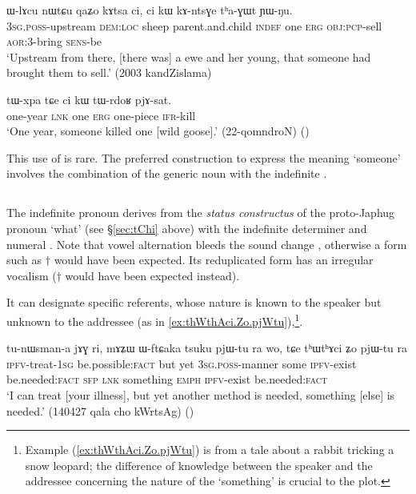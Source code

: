 \begin{exe}
\ex \label{ci.kW.thaGWt}
\gll ɯ-lɤcu nɯtɕu qaʑo kɤtsa ci, ci kɯ kɤ-ntsɣe tʰa-ɣɯt ɲɯ-ŋu. \\
\textsc{3sg}.\textsc{poss}-upstream \textsc{dem}:\textsc{loc} sheep parent.and.child \textsc{indef} one \textsc{erg} \textsc{obj}:\textsc{pcp}-sell \textsc{aor}:3\flobv{}-bring \textsc{sens}-be \\
\glt `Upstream from there, [there was] a ewe and her young, that someone had brought them to sell.' (2003 kandZislama)
\end{exe}

\begin{exe}
\ex \label{ci.kW.tWrdoR}
\gll  tɯ-xpa tɕe ci kɯ tɯ-rdoʁ pjɤ-sat. \\
 one-year \textsc{lnk} one \textsc{erg} one-piece \textsc{ifr}-kill \\
 \glt `One year, someone killed one [wild goose].' (22-qomndroN) ()
\end{exe}

This use of  is rare. The preferred construction to express the meaning `someone' involves the combination of the generic noun  with the indefinite .

\subsection{ } \label{sec:thWci} 
The indefinite pronoun  derives from the \textit{status constructus} of the proto-Japhug pronoun  `what' (see §\ref{sec:tChi} above) with the indefinite determiner and numeral . Note that vowel alternation bleeds the sound change  \fl{}  , otherwise a form such as $\dagger$ would have been expected. Its reduplicated form  has an irregular vocalism  ($\dagger$ would have been expected instead).

 It can designate specific referents, whose nature is known to the speaker but unknown to the addressee (as in \ref{ex:thWthAci.Zo.pjWtu}),\footnote{Example (\ref{ex:thWthAci.Zo.pjWtu}) is from a tale about a rabbit tricking a snow leopard; the difference of knowledge between the speaker and the addressee concerning the nature of the `something' is crucial to the plot. }.

\begin{exe}
\ex  \label{ex:thWthAci.Zo.pjWtu}
\gll tu-nɯsman-a jɤɣ ri, mɤʑɯ ɯ-ftɕaka tsuku pjɯ-tu ra wo, tɕe tʰɯtʰɤci ʑo pjɯ-tu ra \\
\textsc{ipfv}-treat-\textsc{1sg} be.possible:\textsc{fact} but yet \textsc{3sg}.\textsc{poss}-manner some \textsc{ipfv}-exist be.needed:\textsc{fact} \textsc{sfp} \textsc{lnk} something \textsc{emph} \textsc{ipfv}-exist be.needed:\textsc{fact} \\
\glt `I can treat [your illness], but yet another method is needed, something [else] is needed.'  (140427 qala cho kWrtsAg) ()
\end{exe}

